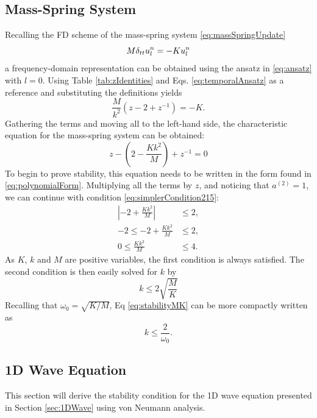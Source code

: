 {{\subsection{Mass-Spring System}
Recalling the FD scheme of the mass-spring system \eqref{eq:massSpringUpdate}
\begin{equation*}
    M \delta_{tt} u_l^n = -K u_l^n
\end{equation*} 
a frequency-domain representation can be obtained using the ansatz in \eqref{eq:ansatz} with $l = 0$. Using Table \ref{tab:zIdentities} and Eqs. \eqref{eq:temporalAnsatz} as a reference and substituting the definitions yields
\begin{equation*}
    \frac{M}{k^2}\left(z -2 +z^{-1}\right) = -K.
\end{equation*}
Gathering the terms and moving all to the left-hand side, the characteristic equation for the mass-spring system can be obtained:
\begin{equation}\label{eq:massSpringCharacteristic}
    z - \left(2-\frac{Kk^2}{M} \right) + z^{-1} = 0    
\end{equation}
To begin to prove stability, this equation needs to be written in the form found in \eqref{eq:polynomialForm}. Multiplying all the terms by $z$, and noticing that $a^{(2)} = 1$, we can continue with condition \eqref{eq:simplerCondition215}:
\begin{align*}
    \left|-2+\frac{Kk^2}{M}\right| &\leq 2,\\
    -2 \leq -2+\frac{Kk^2}{M} &\leq 2,\\
    0 \leq \frac{Kk^2}{M} &\leq 4.
\end{align*}
As $K$, $k$ and $M$ are positive variables, the first condition is always satisfied. The second condition is then easily solved for $k$ by
\begin{equation}\label{eq:stabilityMK}
    k \leq 2\sqrt{\frac{M}{K}}
\end{equation}
Recalling that $\omega_0 = \sqrt{K/M}$, Eq \eqref{eq:stabilityMK} can be more compactly written as 
\begin{equation}
    k \leq \frac{2}{\omega_0}.
\end{equation}

\subsection{1D Wave Equation}
This section will derive the stability condition for the 1D wave equation presented in Section \ref{sec:1DWave} using von Neumann analysis.

}}
